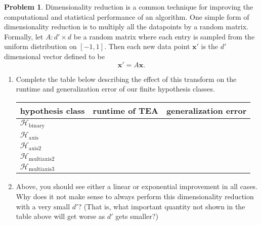 \documentclass[10pt]{exam}
\theoremstyle{definition}
\newtheorem{problem}{Problem}
\newcommand{\x}{\mathbf x}
\newcommand{\ltwo}[1]{{\lVert {#1} \rVert}_2}
\newcommand{\HH}[1]{\mathcal H_{\text{#1}}}
\begin{document}

\newpage
\begin{problem}
    Dimensionality reduction is a common technique for improving the computational and statistical performance of an algorithm.
    One simple form of dimensionality reduction is to multiply all the datapoints by a random matrix.
    Formally, let $A : d' \times d$ be a random matrix where each entry is sampled from the uniform distribution on $[-1, 1]$.
    Then each new data point $\x'$ is the $d'$ dimensional vector defined to be
    \begin{equation}
        \x' = A\x.
    \end{equation}

\begin{enumerate}
\item
Complete the table below describing the effect of this transform on the runtime and generalization error of our finite hypothesis classes.

        \vspace{-0.3in}
\renewcommand{\arraystretch}{5}
\begin{tabular}{p{2in}p{2in}p{2in}}
    hypothesis class & runtime of TEA & generalization error \\
    \hline
    $\HH{binary}$ \\
    $\HH{axis}$ \\
    $\HH{axis2}$ \\
    $\HH{multiaxis2}$ \\
    $\HH{multiaxis3}$ \\
    \hline
\end{tabular}

\vspace{0.2in}
\item
Above, you should see either a linear or exponential improvement in all cases.
Why does it not make sense to always perform this dimensionality reduction with a very small $d'$?
(That is, what important quantity not shown in the table above will get worse as $d'$ gets smaller?)
\end{enumerate}
\end{problem}

\end{document}
